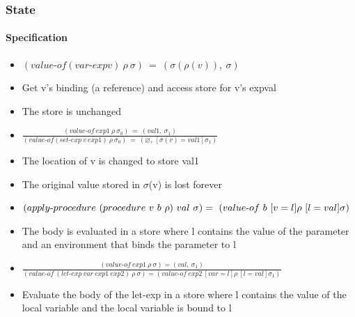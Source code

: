 \documentclass{beamer}
\begin{document}
\begin{frame}[fragile]
\frametitle{State}
\framesubtitle{Specification}
\begin{scriptsize}
\begin{itemize}
\item<1-> $(value\text{-}of (var\text{-}exp v) \ \rho \ \sigma) \ = \ (\sigma(\rho(v)), \ \sigma)$

\item<1-> Get v's binding (a reference) and access store for v's expval

\item<1-> The store is unchanged\newline

\item<2-> $\frac{(value\text{-}of \ exp1 \ \rho \ \sigma_0) \ = \ (val1, \ \sigma_1)
}{(value\text{-}of (set\text{-}exp \ v \ exp1) \ \rho \ \sigma_0) \ = \ (\varnothing, \ \left[\sigma{}(v) = val1\right] \sigma_1)}$

\item<2-> The location of v is changed to store val1

\item<2-> The original value stored in $\sigma$(v) is lost forever \newline

\item<3-> $(apply\text{-}procedure \ (procedure \ v \ b \ \rho) \ val \ \sigma) \newline = \ (value\text{-}of \ b \ [v = l]\rho \ [l = val]\sigma)$

\item<3-> The body is evaluated in a store where l contains the value of the parameter and an environment that binds the parameter to l

\item<4-> $\frac{(value\text{-}of \ exp1 \ \rho \ \sigma)  = (val, \ \sigma_1)}{(value\text{-}of \ (let\text{-}exp \ var \ exp1 \ exp2) \ \rho \ \sigma) = (value\text{-}of \ exp2 \ [var = l]\rho \ \left[l = val\right]\sigma_1)}$

\item<4-> Evaluate the body of the let-exp in a store where l contains the value of the local variable and the local variable is bound to l

\end{itemize}
\end{scriptsize}
\end{frame}
\end{document}
